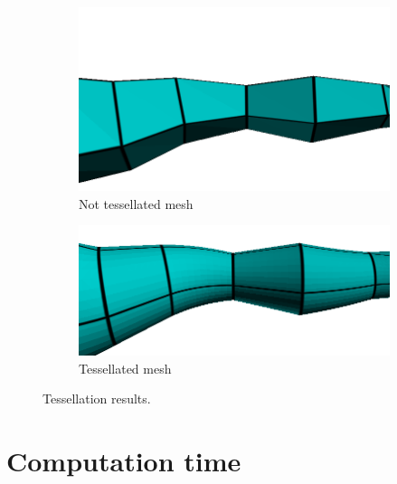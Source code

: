 \begin{figure}[h]
        \centering
        \begin{subfigure}[b]{0.4\textwidth}
                \includegraphics[width=\textwidth]{images/not_tessellated_mesh.png}
                \caption{Not tessellated mesh}
                \label{fig:no_tess}
        \end{subfigure}
        \qquad %
        \begin{subfigure}[b]{0.4\textwidth}
                \includegraphics[width=\textwidth]{images/tessellated_mesh.png}
                \caption{Tessellated mesh}
                \label{fig:tess}
        \end{subfigure}
        \caption[Tessellation results]{Tessellation results.}\label{fig:tes_notess}
\end{figure}

\section{Computation time}

